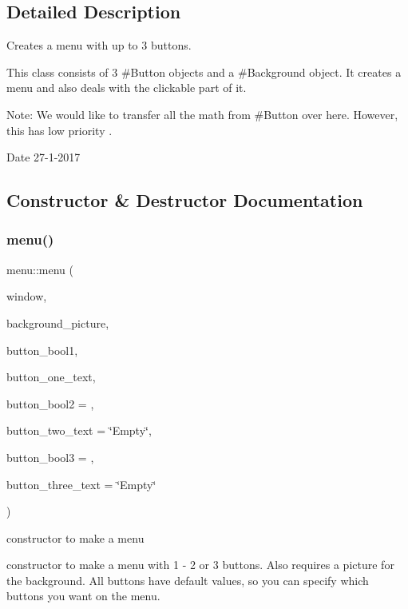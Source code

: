 \subsection{Detailed Description}
Creates a menu with up to 3 buttons. 

This class consists of 3 \#\+Button objects and a \#\+Background object. It creates a menu and also deals with the clickable part of it.

Note\+: We would like to transfer all the math from \#\+Button over here. However, this has low priority .

\begin{DoxyDate}{Date}
27-\/1-\/2017 
\end{DoxyDate}


\subsection{Constructor \& Destructor Documentation}
\mbox{\label{classmenu_a1c6f1319ba2123f9654df695725e83b4}} 
\subsubsection{\texorpdfstring{menu()}{menu()}}
{\footnotesize\ttfamily menu\+::menu (\begin{DoxyParamCaption}\item[{sf\+::\+Render\+Window \&}]{window,  }\item[{std\+::string}]{background\+\_\+picture,  }\item[{bool}]{button\+\_\+bool1,  }\item[{std\+::string}]{button\+\_\+one\+\_\+text,  }\item[{bool}]{button\+\_\+bool2 = {},  }\item[{std\+::string}]{button\+\_\+two\+\_\+text = {\ttfamily \char`\"{}Empty\char`\"{}},  }\item[{bool}]{button\+\_\+bool3 = {},  }\item[{std\+::string}]{button\+\_\+three\+\_\+text = {\ttfamily \char`\"{}Empty\char`\"{}} }\end{DoxyParamCaption})}



constructor to make a menu 

constructor to make a menu with 1 -\/ 2 or 3 buttons. Also requires a picture for the background. All buttons have default values, so you can specify which buttons you want on the menu.


